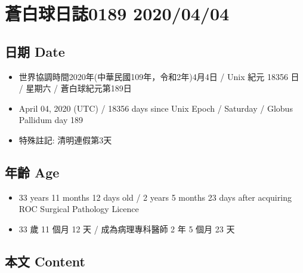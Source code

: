 \documentclass[a5paper, 12pt
]{book}
\providecommand{\tightlist}{%
  \setlength{\itemsep}{0pt}\setlength{\parskip}{0pt}}
\begin{document}
\hypertarget{ux84bcux767dux7403ux65e5ux8a8c0189-20200404}{%
\section{蒼白球日誌0189
2020/04/04}\label{ux84bcux767dux7403ux65e5ux8a8c0189-20200404}}

\hypertarget{ux65e5ux671f-date-34}{%
\subsection{日期 Date}\label{ux65e5ux671f-date-34}}

\begin{itemize}
\tightlist
\item
  世界協調時間2020年(中華民國109年，令和2年)4月4日 / Unix 紀元 18356 日
  / 星期六 / 蒼白球紀元第189日
\item
  April 04, 2020 (UTC) / 18356 days since Unix Epoch / Saturday / Globus
  Pallidum day 189
\item
  特殊註記: 清明連假第3天
\end{itemize}

\hypertarget{ux5e74ux9f61-age-34}{%
\subsection{年齡 Age}\label{ux5e74ux9f61-age-34}}

\begin{itemize}
\tightlist
\item
  33 years 11 months 12 days old / 2 years 5 months 23 days after
  acquiring ROC Surgical Pathology Licence
\item
  33 歲 11 個月 12 天 / 成為病理專科醫師 2 年 5 個月 23 天
\end{itemize}

\hypertarget{ux672cux6587-content-34}{%
\subsection{本文 Content}\label{ux672cux6587-content-34}}
\end{document}
